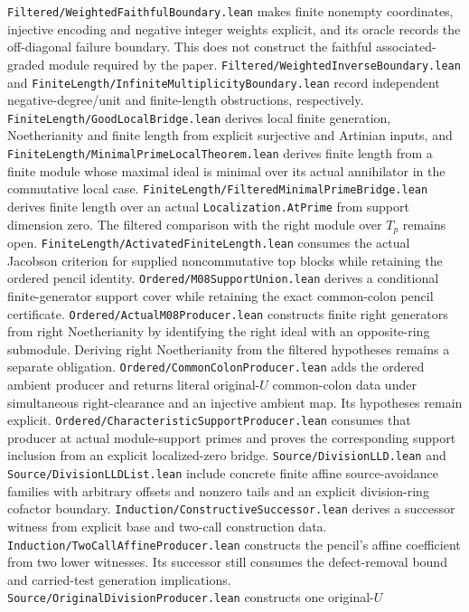 \documentclass[10pt,a4paper]{article}
\newcommand{\lean}[1]{\nolinkurl{#1}}
\begin{document}
\lean{Filtered/WeightedFaithfulBoundary.lean} makes finite nonempty
coordinates, injective encoding and negative integer weights explicit, and its
oracle records the off-diagonal failure boundary. This does not construct the
faithful associated-graded module required by the paper.
\lean{Filtered/WeightedInverseBoundary.lean} and
\lean{FiniteLength/InfiniteMultiplicityBoundary.lean} record independent
negative-degree/unit and finite-length obstructions, respectively.
\lean{FiniteLength/GoodLocalBridge.lean} derives local finite generation,
Noetherianity and finite length from explicit surjective and Artinian inputs,
and \lean{FiniteLength/MinimalPrimeLocalTheorem.lean} derives finite length
from a finite module whose maximal ideal is minimal over its actual
annihilator in the commutative local case.
\lean{FiniteLength/FilteredMinimalPrimeBridge.lean} derives finite length
over an actual \lean{Localization.AtPrime} from support dimension zero.
The filtered comparison with the right module over \(T_p\) remains open.
\lean{FiniteLength/ActivatedFiniteLength.lean}
consumes the actual
Jacobson criterion for supplied noncommutative top blocks while retaining the
ordered pencil identity.
\lean{Ordered/M08SupportUnion.lean} derives a conditional finite-generator
support cover while retaining the exact common-colon pencil certificate.
\lean{Ordered/ActualM08Producer.lean} constructs finite right generators
from right Noetherianity by identifying the right ideal with an
opposite-ring submodule. Deriving right Noetherianity from the filtered
hypotheses remains a separate obligation.
\lean{Ordered/CommonColonProducer.lean} adds the ordered ambient producer and
returns literal original-\(U\) common-colon data under simultaneous
right-clearance and an injective ambient map. Its hypotheses remain explicit.
\lean{Ordered/CharacteristicSupportProducer.lean} consumes that producer at
actual module-support primes and proves the corresponding support inclusion
from an explicit localized-zero bridge.
\lean{Source/DivisionLLD.lean} and \lean{Source/DivisionLLDList.lean} include
concrete finite affine source-avoidance families with arbitrary offsets and nonzero tails and an
explicit division-ring cofactor boundary. \lean{Induction/ConstructiveSuccessor.lean}
derives a successor witness from explicit base and two-call construction data.
\lean{Induction/TwoCallAffineProducer.lean} constructs the pencil's affine
coefficient from two lower witnesses. Its successor still consumes the
defect-removal bound and carried-test generation implications.
\lean{Source/OriginalDivisionProducer.lean} constructs one original-\(U\)
\end{document}
